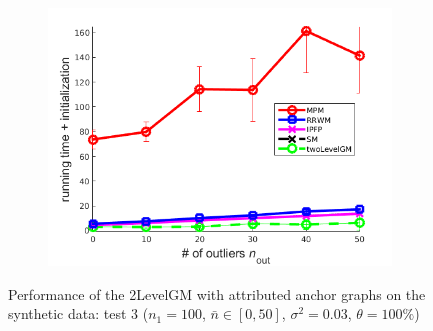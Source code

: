 \begin{figure}[h]
\begin{subfigure}[b]{0.33\textwidth}
			\includegraphics[scale=0.25]{"chapter3/fig/SyntheticTest/descr/Results_v4.3.3/Test1/time_summary_avg10t"} 
		\end{subfigure} 	
	\caption[Performance of the 2LevelGM with attributed anchor graphs on the synthetic data (test $3$)]{Performance of the 2LevelGM with attributed anchor graphs on the synthetic data: test $3$ ($n_1=100$, $\bar{n}\in[0,50]$, $\sigma^2=0.03$, $\theta=100\%$)}
	\label{fig:synTest3_descr_ver433}
\end{figure}
